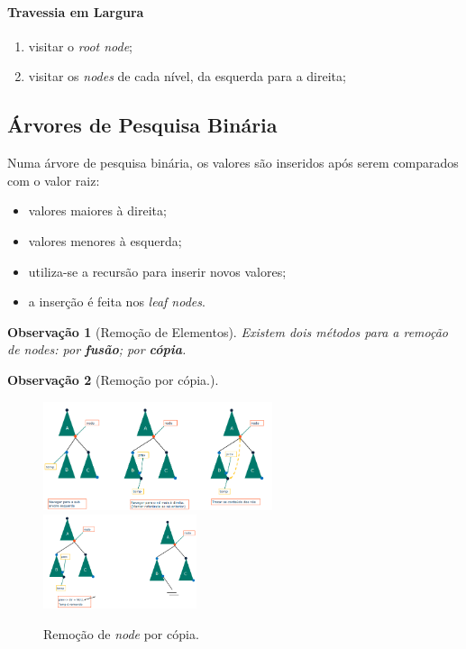 \documentclass[a4paper, 12pt]{article}
\newtheorem{remark}{Observação}
\begin{document}
\paragraph{Travessia em Largura}
\begin{enumerate}
    \item visitar o \emph{root node};
    \item visitar os \emph{nodes} de cada nível, da esquerda para a direita;
\end{enumerate}

\subsection{Árvores de Pesquisa Binária}
Numa árvore de pesquisa binária, os valores são inseridos após serem comparados com o valor raiz:
\begin{itemize}
    \item valores maiores à direita;
    \item valores menores à esquerda;
    \item utiliza-se a recursão para inserir novos valores;
    \item a inserção é feita nos \emph{leaf nodes}.
\end{itemize}

\begin{remark}[Remoção de Elementos]
    Existem dois métodos para a remoção de \emph{nodes}: por \textbf{fusão}; por \textbf{cópia}.
\end{remark}

\begin{remark}[Remoção por cópia.]
\end{remark}
\begin{figure}[H]
    \centering
    \includegraphics[width=0.6\textwidth]{fig/t/bstRemoveCopy.png}
    \includegraphics[width=0.4\textwidth]{fig/t/bstRemoveCopy2.png}
    \caption{Remoção de \emph{node} por cópia.}
\end{figure}
\end{document}
